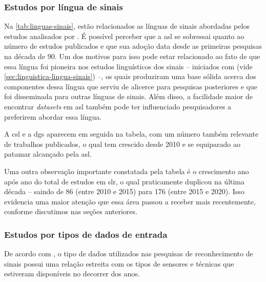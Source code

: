 \subsubsection{Estudos por língua de sinais}
\label{sec:slr-linguas-sinais}

Na \autoref{tab:linguas-sinais}, estão relacionados as línguas de sinais abordadas pelos estudos analisados por . É possível perceber que a \acrfull{asl} se sobressai quanto ao número de estudos publicados e que sua adoção data desde as primeiras pesquisas na década de 90. Um dos motivos para isso pode estar relacionado ao fato de que essa língua foi pioneira nos estudos linguísticos dos sinais -- iniciados com  (vide \autoref{sec:linguistica-lingua-sinais}) --, os quais produziram uma base sólida acerca dos componentes dessa língua que serviu de alicerce para pesquisas posteriores e que foi disseminada para outras línguas de sinais. Além disso, a facilidade maior de encontrar \textit{datasets} em \acrshort{asl} também pode ter influenciado pesquisadores a preferirem abordar essa língua.

A \acrfull{csl} e a \acrfull{dgs} aparecem em seguida na tabela, com um número também relevante de trabalhos publicados, o qual tem crescido desde 2010 e se equiparado ao patamar alcançado pela \acrshort{asl}.



Uma outra observação importante constatada pela tabela é o crescimento ano após ano do total de estudos em \acrshort{slr}, o qual praticamente duplicou na última década -- saindo de 86 (entre 2010 e 2015) para 176 (entre 2015 e 2020). Isso evidencia uma maior atenção que essa área passou a receber mais recentemente, conforme discutimos nas seções anteriores.



\subsubsection{Estudos por tipos de dados de entrada}
\label{sec:slr-tipos-dados-entrada}

De acordo com , o tipo de dados utilizados nas pesquisas de reconhecimento de sinais possui uma relação estreita com os tipos de sensores e técnicas que estiveram disponíveis no decorrer dos anos. 

